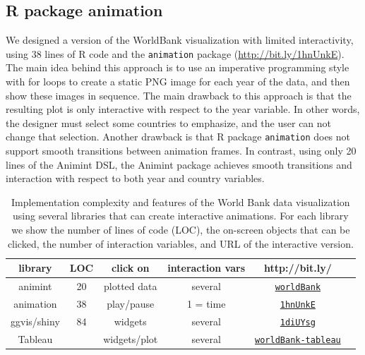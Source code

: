 \documentclass[10pt,journal,compsoc]{IEEEtran}\usepackage[]{graphicx}\usepackage[]{color}
\newcommand{\bitly}[1]{\href{http://bit.ly/#1}{\texttt{#1}}}
\begin{document}
\subsection{R package animation}
\label{sec:compare-animation}

We designed a version of the WorldBank visualization with limited
interactivity, using 38 lines of R code and the \texttt{animation}
package (\url{http://bit.ly/1hnUnkE}). The main idea behind this
approach is to use an imperative programming style with for loops to
create a static PNG image for each year of the data, and then show
these images in sequence. The main drawback to this approach is that
the resulting plot is only interactive with respect to the year
variable. In other words, the designer must select some countries to
emphasize, and the user can not change that selection. Another
drawback is that R package \texttt{animation} does not support smooth
transitions between animation frames. In contrast, using only 20 lines
of the Animint DSL, the Animint package achieves smooth transitions
and interaction with respect to both year and country variables.

\begin{table}[t!]
  \caption{Implementation complexity and features
    of the World Bank data visualization
    using several libraries that can create interactive animations.
    For each library
    we show the number of lines of code (LOC), the on-screen objects
    that can be clicked,  the
    number of interaction variables, and URL of the interactive version.
  }
 \label{tab:packages}
 \scriptsize
 \begin{center}
  \begin{tabular}{cccccc}
    library &
    LOC &
    click on &
    interaction vars &
    http://bit.ly/
    \\
    \hline
    animint &
    20 &
    plotted data &
    several &
      \bitly{worldBank}
    \\
    animation &
    38 &
    play/pause &
    1 = time &
    \bitly{1hnUnkE}
    \\
    ggvis/shiny &
    84 &
    widgets &
    several &
    \bitly{1diUYsg}
    \\
    Tableau &
      &
    widgets/plot &
    several &
    \bitly{worldBank-tableau}
    \\
  \end{tabular}
 \end{center}
\end{table}
\end{document}
